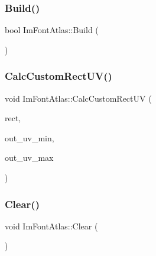 \hypertarget{struct_im_font_atlas_a81e39e30dffa4dd7e458a53297451e27}{}\label{struct_im_font_atlas_a81e39e30dffa4dd7e458a53297451e27} 
\subsubsection{\texorpdfstring{Build()}{Build()}}
{\footnotesize\ttfamily bool Im\+Font\+Atlas\+::\+Build (\begin{DoxyParamCaption}{ }\end{DoxyParamCaption})}

\hypertarget{struct_im_font_atlas_a70e062104b11a213eb3d177151c418e2}{}\label{struct_im_font_atlas_a70e062104b11a213eb3d177151c418e2} 
\subsubsection{\texorpdfstring{Calc\+Custom\+Rect\+U\+V()}{CalcCustomRectUV()}}
{\footnotesize\ttfamily void Im\+Font\+Atlas\+::\+Calc\+Custom\+Rect\+UV (\begin{DoxyParamCaption}\item[{const \hyperlink{struct_im_font_atlas_1_1_custom_rect}{Custom\+Rect} $\ast$}]{rect,  }\item[{\hyperlink{struct_im_vec2}{Im\+Vec2} $\ast$}]{out\+\_\+uv\+\_\+min,  }\item[{\hyperlink{struct_im_vec2}{Im\+Vec2} $\ast$}]{out\+\_\+uv\+\_\+max }\end{DoxyParamCaption})}

\hypertarget{struct_im_font_atlas_a8f6d01c671d8670f991ba651bbaf7e77}{}\label{struct_im_font_atlas_a8f6d01c671d8670f991ba651bbaf7e77} 
\subsubsection{\texorpdfstring{Clear()}{Clear()}}
{\footnotesize\ttfamily void Im\+Font\+Atlas\+::\+Clear (\begin{DoxyParamCaption}{ }\end{DoxyParamCaption})}

\hypertarget{struct_im_font_atlas_ad5c2560d708bd0c389e9bd9da2d9b055}{}\label{struct_im_font_atlas_ad5c2560d708bd0c389e9bd9da2d9b055} 
